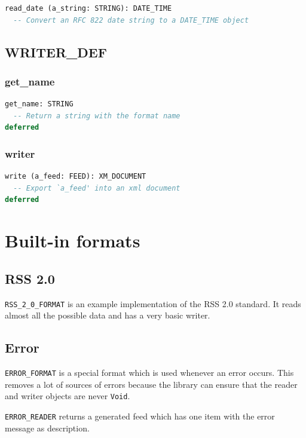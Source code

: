 \begin{lstlisting}[language=Eiffel]
read_date (a_string: STRING): DATE_TIME
  -- Convert an RFC 822 date string to a DATE_TIME object
\end{lstlisting}


\subsection{WRITER\_DEF}
\label{sec:formats-writer-def}

\subsubsection{get\_name}

\begin{lstlisting}[language=Eiffel]
get_name: STRING
  -- Return a string with the format name
deferred
\end{lstlisting}

\subsubsection{writer}

\begin{lstlisting}[language=Eiffel]
write (a_feed: FEED): XM_DOCUMENT
  -- Export `a_feed' into an xml document
deferred
\end{lstlisting}


\section{Built-in formats}
\label{sec:formats-built-in}


\subsection{RSS 2.0}
\label{sec:formats-rss2}

\texttt{RSS\_2\_0\_FORMAT} is an example implementation of the RSS 2.0
standard. It reads almost all the possible data and has a very basic
writer.


\subsection{Error}
\label{sec:formats-error}

\texttt{ERROR\_FORMAT} is a special format which is used whenever an
error occurs. This removes a lot of sources of errors because the
library can ensure that the reader and writer objects are never
\texttt{Void}.

\texttt{ERROR\_READER} returns a generated feed which has one item
with the error message as description.